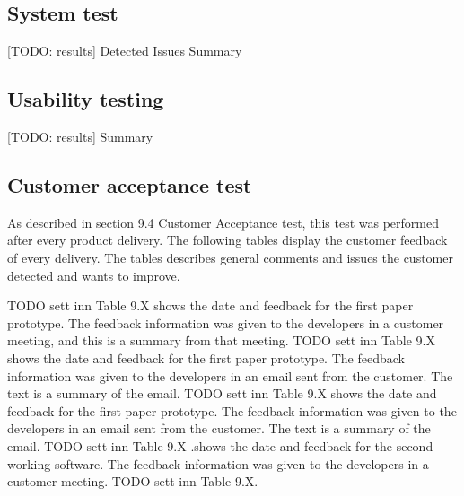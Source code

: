 \subsection{System test}
[TODO: results]\newline
Detected Issues\newline
Summary

\subsection{Usability testing}
[TODO: results]\newline
Summary

\subsection{Customer acceptance test}

As described in section 9.4 Customer Acceptance test, this test was performed after every product delivery. The following tables display the customer feedback of every delivery. The tables describes general comments and issues the customer detected and wants to improve.  

TODO sett inn Table 9.X shows the date and feedback for the first paper prototype. The feedback information was given to the developers in a customer meeting, and this is a summary from that meeting.\newline
TODO sett inn Table 9.X shows the date and feedback for the first paper prototype. The feedback information was given to the developers in an email sent from the customer. The text is a summary of the email.\newline
TODO sett inn Table 9.X shows the date and feedback for the first paper prototype. The feedback information was given to the developers in an email sent from the customer. The text is a summary of the email.\newline
TODO sett inn Table 9.X .shows the date and feedback for the second working software. The feedback information was given to the developers in a customer meeting.\newline
TODO sett inn Table 9.X.

\cleardoublepage